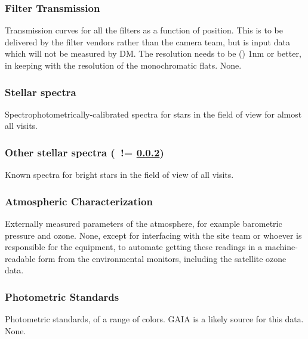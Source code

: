 \subsubsection{Filter Transmission}\label{sec:CPP:inputs:filterTransmission}
Transmission curves for all the filters as a function of position. \Nb This is to be delivered by the filter vendors rather than the camera team, but is input data which will not be measured by DM. The resolution needs to be () 1nm or better, in keeping with the resolution of the monochromatic flats.
\alg None.


\subsubsection{Stellar spectra}\label{sec:CPP:inputs:starSpectrum} 
Spectrophotometrically-calibrated spectra for stars in the field of view for almost all visits.
\alg {}


\subsubsection{Other stellar spectra (\nb~!= \ref{sec:CPP:inputs:starSpectrum})}\label{sec:CPP:inputs:standardStarSpectrum}
Known spectra for bright stars in the field of view of all visits.
\alg {}


\subsubsection{Atmospheric Characterization}\label{sec:CPP:inputs:atmosphericData}
Externally measured parameters of the atmosphere, for example barometric pressure and ozone.
\alg None, except for interfacing with the site team or whoever is responsible for the equipment, to automate getting these readings in a machine-readable form from the environmental monitors, including the satellite ozone data.


\subsubsection{Photometric Standards}\label{sec:CPP:inputs:photometricStandards} 
Photometric standards, of a range of colors. GAIA is a likely source for this data.
\alg None.


